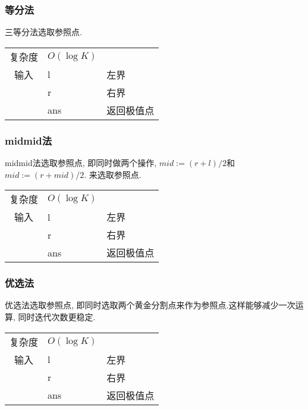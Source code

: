         \subsubsection{等分法}\small
三等分法选取参照点.

\begin{longtable}{|c|l|l|}
复杂度 & $O(\log K)$ &  \\
输入 & l & 左界 \\
 & r & 右界 \\
 & ans & 返回极值点 \\ 
\end{longtable}



        \subsubsection{midmid法}\small
midmid法选取参照点, 即同时做两个操作, $mid := (r + l) / 2$和$mid := (r + mid) / 2$.
来选取参照点.

\begin{longtable}{|c|l|l|}
复杂度 & $O(\log K)$ &  \\
输入 & l & 左界 \\
 & r & 右界 \\
 & ans & 返回极值点 \\ 
\end{longtable}



        \subsubsection{优选法}\small
优选法选取参照点, 即同时选取两个黄金分割点来作为参照点.这样能够减少一次运
算, 同时迭代次数更稳定.

\begin{longtable}{|c|l|l|}
复杂度 & $O(\log K)$ &  \\
输入 & l & 左界 \\
 & r & 右界 \\
 & ans & 返回极值点 \\ 
\end{longtable}



